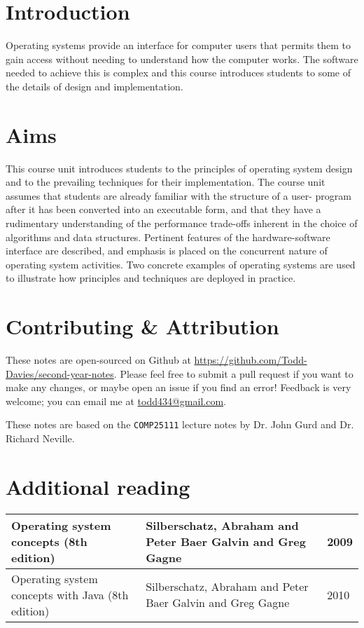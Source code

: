 \section*{Introduction}

Operating systems provide an interface for computer users that permits them to
gain access without needing to understand how the computer works. The software
needed to achieve this is complex and this course introduces students to some of
the details of design and implementation.

\section*{Aims}

This course unit introduces students to the principles of operating system
design and to the prevailing techniques for their implementation. The course
unit assumes that students are already familiar with the structure of a user-
program after it has been converted into an executable form, and that they have
a rudimentary understanding of the performance trade-offs inherent in the choice
of algorithms and data structures. Pertinent features of the hardware-software
interface are described, and emphasis is placed on the concurrent nature of
operating system activities. Two concrete examples of operating systems are used
to illustrate how principles and techniques are deployed in practice.

\section*{Contributing \& Attribution}

These notes are open-sourced on Github at
\url{https://github.com/Todd-Davies/second-year-notes}. Please feel free to
submit a pull request if you want to make any changes, or maybe open an issue
if you find an error! Feedback is very welcome; you can email me at
\href{mailto:todd434@gmail.com}{todd434@gmail.com}.

These notes are based on the \texttt{COMP25111} lecture notes by Dr. John Gurd
and Dr. Richard Neville.

\section*{Additional reading}

\begin{tabularx}{\textwidth}{X|X|l}
  Operating system concepts (8th edition) & Silberschatz, Abraham and Peter Baer Galvin and Greg Gagne & 2009\\ \hline
  Operating system concepts with Java (8th edition) & Silberschatz, Abraham and Peter Baer Galvin and Greg Gagne & 2010
\end{tabularx}